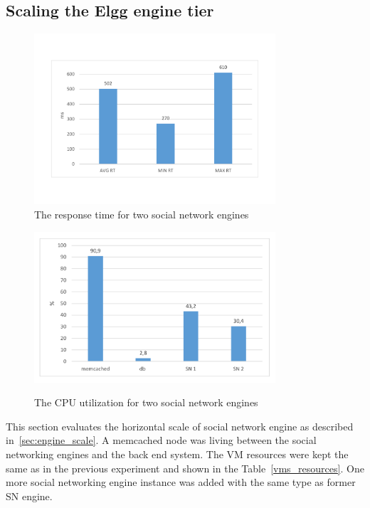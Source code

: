 \subsection{Scaling the Elgg engine tier}

\begin{figure}[h]
	\centering
	\includegraphics[width=0.8\textwidth,natwidth=200,natheight=150]{./fig/RT2SN.pdf}
	\caption{The response time for two social network engines}
	\label{fig:rt2SN}
\end{figure}

\begin{figure}[h]
	\caption{The CPU utilization for two social network engines}
	\includegraphics[width=0.8\textwidth,natwidth=200,natheight=150]{./fig/Usage2SN.pdf}
	\centering
	\label{fig:cpu2SNavg}
\end{figure}

This section evaluates the horizontal scale of social network engine as described in~\ref{sec:engine_scale}. A memcached node was living between the social networking engines and the back end system. The VM resources were kept the same as in the previous experiment and shown in the Table~\ref{vms_resources}. One more social networking engine instance was added with the same type as former SN engine. 

